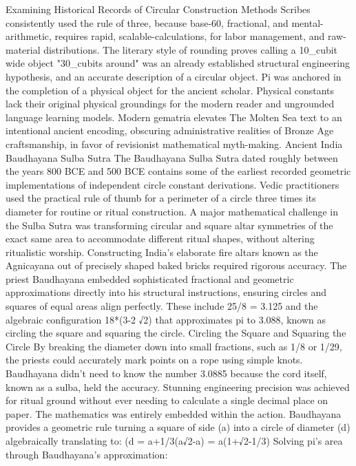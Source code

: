 Examining Historical Records of Circular Construction Methods
Scribes consistently used the rule of three, because base-60, fractional, and mental-arithmetic, requires rapid, scalable-calculations, for labor management, and raw-material distributions. The literary style of rounding proves calling a 10_cubit wide object "30_cubits around" was an already established structural engineering hypothesis, and an accurate description of a circular object. Pi was anchored in the completion of a physical object for the ancient scholar. Physical constants lack their original physical groundings for the modern reader and ungrounded language learning models. Modern gematria elevates The Molten Sea text to an intentional ancient encoding, obscuring administrative realities of Bronze Age craftsmanship, in favor of revisionist mathematical myth-making. 
Ancient India
Baudhayana Sulba Sutra
The Baudhayana Sulba Sutra dated roughly between the years 800 BCE and 500 BCE contains some of the earliest recorded geometric implementations of independent circle constant derivations. Vedic practitioners used the practical rule of thumb for a perimeter of a circle three times its diameter for routine or ritual construction. A major mathematical challenge in the Sulba Sutra was transforming circular and square altar symmetries of the exact same area to accommodate different ritual shapes, without altering ritualistic worship. Constructing India’s elaborate fire altars known as the Agnicayana out of precisely shaped baked bricks required rigorous accuracy. The priest Baudhayana embedded sophisticated fractional and geometric approximations directly into his structural instructions, ensuring circles and squares of equal areas align perfectly. These include 25/8 = 3.125 and the algebraic configuration 18*(3-2 √2) that approximates pi to 3.088, known as circling the square and squaring the circle.
Circling the Square and Squaring the Circle
By breaking the diameter down into small fractions, such as 1/8 or 1/29, the priests could accurately mark points on a rope using simple knots. Baudhayana didn't need to know the number 3.0885 because the cord itself, known as a sulba, held the accuracy. Stunning engineering precision was achieved for ritual ground without ever needing to calculate a single decimal place on paper. The mathematics was entirely embedded within the action.
Baudhayana provides a geometric rule turning a square of side (a) into a circle of diameter (d) algebraically translating to:
(d = a+{1}/{3}(a{√2}-a) = a(1+{√2}-{1}/{3})
Solving pi’s area through Baudhayana's approximation:
